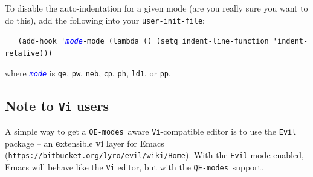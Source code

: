 \documentclass[12pt,a4paper]{article}
\def\QEmodes{\texttt{QE-modes}}
\def\var#1{\textcolor{Blue}{\texttt{\textit{#1}}}}
\begin{document}
To disable the auto-indentation for a given mode (are you really sure
you want to do this), add the following into your
\texttt{user-init-file}:

{\small
\begin{flushleft}
\verb+   (add-hook '+\var{mode}\verb+-mode (lambda () (setq indent-line-function 'indent-relative)))+
\end{flushleft}
}

\noindent where \var{mode} is \texttt{qe}, \texttt{pw}, \texttt{neb}, \texttt{cp},
\texttt{ph}, \texttt{ld1}, or \texttt{pp}.

\subsection{Note to \texttt{Vi} users}

A simple way to get a \QEmodes\ aware \texttt{Vi}-compatible editor is
to use the \texttt{Evil} package -- an \textbf{e}xtensible \textbf{vi}
\textbf{l}ayer for Emacs
(\texttt{https://bitbucket.org/lyro/evil/wiki/Home}). With the
\texttt{Evil} mode enabled, Emacs will behave like the \texttt{Vi}
editor, but with the \QEmodes\ support.
\end{document}
